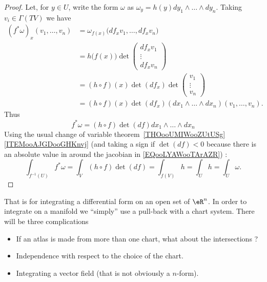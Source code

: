 \begin{proof}
    Let, for \( y\in U\), write the form \( \omega\) as \( \omega_y=h(y)dy_1\wedge\ldots\wedge dy_n\). Taking \( v_i\in \Gamma(TV)\) we have
    \begin{subequations}
        \begin{align}
            (f^*\omega)_x(v_1,\ldots, v_n)&=\omega_{f(x)}\big( df_xv_1,\ldots, df_xv_n \big)\\
            &=h\big( f(x) \big)\det\begin{pmatrix}
                df_xv_1    \\
                \vdots    \\
                df_xv_n
            \end{pmatrix}\\
            &=(h\circ f)(x)\det(df_x)\det\begin{pmatrix}
                v_1    \\
                \vdots    \\
                v_n
            \end{pmatrix}\\
            &=(h\circ f)(x)\det(df_x)(dx_1\wedge\ldots\wedge dx_n)(v_1,\ldots, v_n).
        \end{align}
    \end{subequations}
    Thus
    \begin{equation}
        f^*\omega= (h\circ f)\det(df)dx_1\wedge\ldots\wedge dx_n
    \end{equation}
    Using the usual change of variable theorem~\ref{THOooUMIWooZUtUSg}\ref{ITEMooAJGDooGHKnvj} (and taking a sign if \( \det(df)<0\) because there is an absolute value in around the jacobian in \eqref{EQooLYAWooTArAZR}) :
    \begin{equation}
        \int_{f^{-1}(U)}f^*\omega=\int_V(h\circ f)\det(df)=\int_{f(V)}h=\int_Uh=\int_U\omega.
    \end{equation}
\end{proof}

That is for integrating a differential form on an open set of \( \eR^n\). In order to integrate on a manifold we ``simply'' use a pull-back with a chart system. There will be three complications
\begin{itemize}
    \item If an atlas is made from more than one chart, what about the intersections ?
    \item Independence with respect to the choice of the chart.
    \item Integrating a vector field (that is not obviously a \( n\)-form).
\end{itemize}

